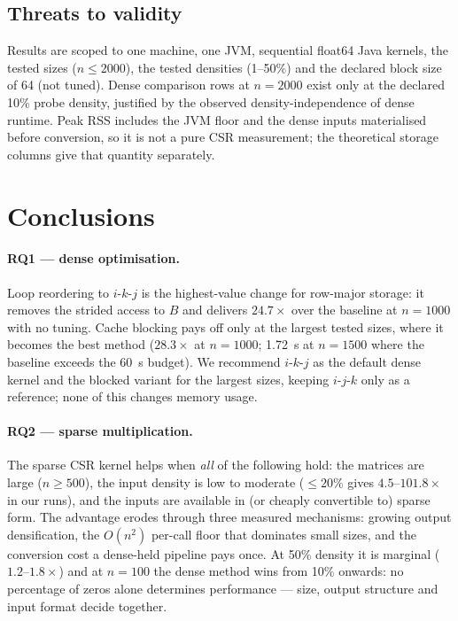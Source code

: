 \documentclass[11pt,a4paper]{article}
\begin{document}
\subsection{Threats to validity}

Results are scoped to one machine, one JVM, sequential float64 Java kernels,
the tested sizes ($n \le 2000$), the tested densities (1--50\%) and the
declared block size of 64 (not tuned). Dense comparison rows at $n = 2000$
exist only at the declared 10\% probe density, justified by the observed
density-independence of dense runtime. Peak RSS includes the JVM floor and
the dense inputs materialised before conversion, so it is not a pure CSR
measurement; the theoretical storage columns give that quantity separately.

\section{Conclusions}
\label{sec:conclusions}

\paragraph{RQ1 --- dense optimisation.} Loop reordering to $i$-$k$-$j$ is
the highest-value change for row-major storage: it removes the strided access
to $B$ and delivers $24.7\times$ over the baseline at $n = 1000$ with no
tuning. Cache blocking pays off only at the largest tested sizes, where it
becomes the best method ($28.3\times$ at $n = 1000$; 1.72~s at $n = 1500$
where the baseline exceeds the 60~s budget). We recommend $i$-$k$-$j$ as the
default dense kernel and the blocked variant for the largest sizes, keeping
$i$-$j$-$k$ only as a reference; none of this changes memory usage.

\paragraph{RQ2 --- sparse multiplication.} The sparse CSR kernel helps when
\emph{all} of the following hold: the matrices are large ($n \ge 500$), the
input density is low to moderate ($\le 20\%$ gives $4.5$--$101.8\times$ in
our runs), and the inputs are available in (or cheaply convertible to) sparse
form. The advantage erodes through three measured mechanisms: growing output
densification, the $O(n^2)$ per-call floor that dominates small sizes, and
the conversion cost a dense-held pipeline pays once. At 50\% density it is
marginal ($1.2$--$1.8\times$) and at $n = 100$ the dense method wins from
10\% onwards: no percentage of zeros alone determines performance --- size,
output structure and input format decide together.
\end{document}

